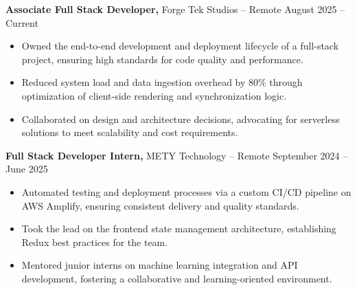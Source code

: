 \documentclass[11pt]{article}       %
\begin{document}
\textbf{Associate Full Stack Developer,} {Forge Tek Studios} -- Remote \hfill August 2025 -- Current 
\vspace{-9pt}
\begin{itemize}
  \item Owned the end-to-end development and deployment lifecycle of a full-stack project, ensuring high standards for code quality and performance.
  \item Reduced system load and data ingestion overhead by 80\% through optimization of client-side rendering and synchronization logic.
  \item Collaborated on design and architecture decisions, advocating for serverless solutions to meet scalability and cost requirements.
\end{itemize}

\textbf{Full Stack Developer Intern,} {METY Technology} -- Remote \hfill September 2024 -- June 2025 
\vspace{-9pt}
\begin{itemize}
  \item Automated testing and deployment processes via a custom CI/CD pipeline on AWS Amplify, ensuring consistent delivery and quality standards.
  \item Took the lead on the frontend state management architecture, establishing Redux best practices for the team.
  \item Mentored junior interns on machine learning integration and API development, fostering a collaborative and learning-oriented environment.
\end{itemize}

\end{document}
